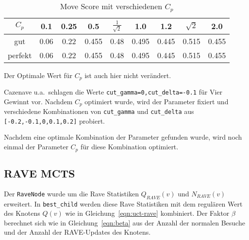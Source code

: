 \begin{table}[h!]
\centering
\begin{tabular}{ |c||c|c|c|c|c|c|c|c| }
 \hline
 $C_p$ & 0.1 & 0.25 & 0.5 & $\frac{1}{\sqrt{2}}$ & 1.0 & 1.2 & $\sqrt{2}$ & 2.0 \\
 \hline
  gut & 0.06 & 0.22 & 0.455 & 0.48 & 0.495 & 0.445 & 0.515 & 0.455 \\
 \hline
  perfekt & 0.06 & 0.22 & 0.455 & 0.48 & 0.495 & 0.445 & 0.515 & 0.455 \\
 \hline
\end{tabular}
\caption{Move Score mit verschiedenen $C_p$}
\label{tab:scorebound-move-score}
\end{table}

Der Optimale Wert für $C_p$ ist auch hier nicht verändert.

Cazenave u.a.\ schlagen die Werte \verb|cut_gamma=0,cut_delta=-0.1| für Vier Gewinnt vor.
Nachdem $C_p$ optimiert wurde, wird der Parameter fixiert und verschiedene Kombinationen von \verb|cut_gamma| und \verb|cut_delta| aus \verb|[-0.2,-0.1,0,0.1,0.2]| probiert.


Nachdem eine optimale Kombination der Parameter gefunden wurde, wird noch einmal der Parameter $C_p$ für diese Kombination optimiert.


\subsection{RAVE MCTS}

Der \verb|RaveNode| wurde um die Rave Statistiken $Q_{RAVE}(v)$ und $N_{RAVE}(v)$ erweitert.
In \verb|best_child| werden diese Rave Statistiken mit dem regulären Wert des Knotens $Q(v)$ wie in Gleichung~\ref{eqn:uct-rave} kombiniert.
Der Faktor $\beta$ berechnet sich wie in Gleichung~\ref{eqn:beta} aus der Anzahl der normalen Besuche und der Anzahl der RAVE-Updates des Knotens.

